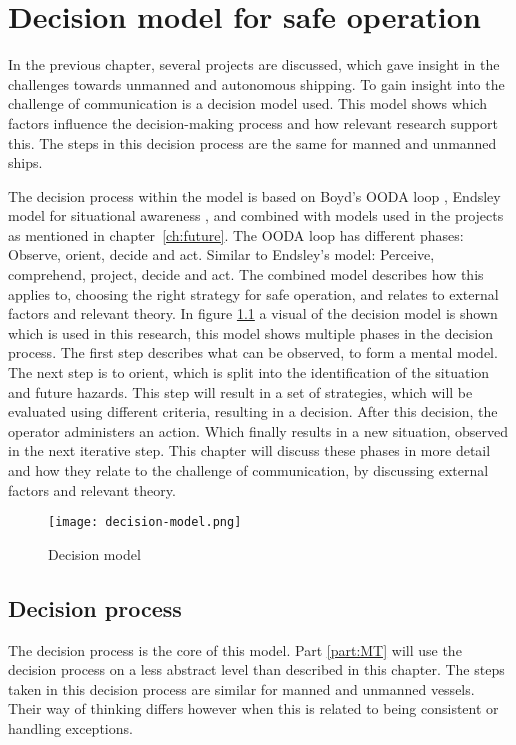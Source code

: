 \chapter{Decision model for safe operation}
\label{ch:model}
In the previous chapter, several projects are discussed, which gave insight in the challenges towards unmanned and autonomous shipping. To gain insight into the challenge of communication is a decision model used. This model shows which factors influence the decision-making process and how relevant research support this. The steps in this decision process are the same for manned and unmanned ships.

The decision process within the model is based on Boyd's OODA loop \cite{Boyd1987}, Endsley model for situational awareness \cite{Endsley2013}, and combined with models used in the projects as mentioned in chapter~\ref{ch:future}. 
The OODA loop has different phases: Observe, orient, decide and act. Similar to Endsley's model: Perceive, comprehend, project, decide and act. 
The combined model describes how this applies to, choosing the right strategy for safe operation, and relates to external factors and relevant theory. In figure \ref{fig:decision-model} a visual of the decision model is shown which is used in this research, this model shows multiple phases in the decision process. The first step describes what can be observed, to form a mental model. The next step is to orient, which is split into the identification of the situation and future hazards. This step will result in a set of strategies, which will be evaluated using different criteria, resulting in a decision. After this decision, the operator administers an action. Which finally results in a new situation, observed in the next iterative step. This chapter will discuss these phases in more detail and how they relate to the challenge of communication, by discussing external factors and relevant theory.

\begin{figure}[p]
	\centering
	\texttt{[image: decision-model.png]}
	\caption{Decision model}
	\label{fig:decision-model}
\end{figure}

\section{Decision process}
The decision process is the core of this model. Part \ref{part:MT} will use the decision process on a less abstract level than described in this chapter. The steps taken in this decision process are similar for manned and unmanned vessels. Their way of thinking differs however when this is related to being consistent or handling exceptions.

